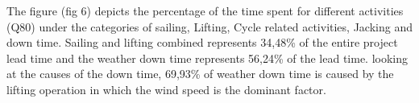 The figure (fig 6) depicts the percentage of the time spent for different activities (Q80) under the categories of sailing, Lifting, Cycle related activities, Jacking and down time. Sailing and lifting combined represents 34,48\% of the entire project lead time and the weather down time represents 56,24\% of the lead time. looking at the causes of the down time, 69,93\% of weather down time is caused by the lifting operation in which the wind speed is the dominant factor.